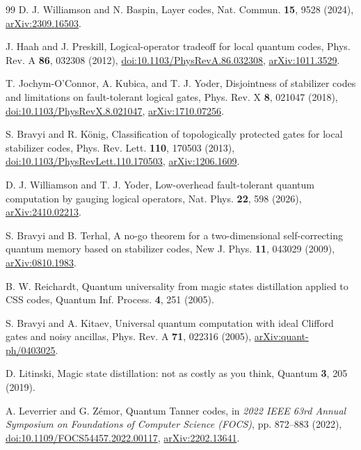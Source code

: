 \begin{thebibliography}{99}
D. J. Williamson and N. Baspin, Layer codes, Nat. Commun. \textbf{15}, 9528 (2024), \href{https://arxiv.org/abs/2309.16503}{arXiv:2309.16503}.

J. Haah and J. Preskill, Logical-operator tradeoff for local quantum codes, Phys. Rev. A \textbf{86}, 032308 (2012), \href{https://doi.org/10.1103/PhysRevA.86.032308}{doi:10.1103/PhysRevA.86.032308}, \href{https://arxiv.org/abs/1011.3529}{arXiv:1011.3529}.

T. Jochym-O'Connor, A. Kubica, and T. J. Yoder, Disjointness of stabilizer codes and limitations on fault-tolerant logical gates, Phys. Rev. X \textbf{8}, 021047 (2018), \href{https://doi.org/10.1103/PhysRevX.8.021047}{doi:10.1103/PhysRevX.8.021047}, \href{https://arxiv.org/abs/1710.07256}{arXiv:1710.07256}.

S. Bravyi and R. K\"onig, Classification of topologically protected gates for local stabilizer codes, Phys. Rev. Lett. \textbf{110}, 170503 (2013), \href{https://doi.org/10.1103/PhysRevLett.110.170503}{doi:10.1103/PhysRevLett.110.170503}, \href{https://arxiv.org/abs/1206.1609}{arXiv:1206.1609}.

D. J. Williamson and T. J. Yoder, Low-overhead fault-tolerant quantum computation by gauging logical operators, Nat. Phys. \textbf{22}, 598 (2026), \href{https://arxiv.org/abs/2410.02213}{arXiv:2410.02213}.

S. Bravyi and B. Terhal, A no-go theorem for a two-dimensional self-correcting quantum memory based on stabilizer codes, New J. Phys. \textbf{11}, 043029 (2009), \href{https://arxiv.org/abs/0810.1983}{arXiv:0810.1983}.

B. W. Reichardt, Quantum universality from magic states distillation applied to CSS codes, Quantum Inf. Process. \textbf{4}, 251 (2005).

S. Bravyi and A. Kitaev, Universal quantum computation with ideal Clifford gates and noisy ancillas, Phys. Rev. A \textbf{71}, 022316 (2005), \href{https://arxiv.org/abs/quant-ph/0403025}{arXiv:quant-ph/0403025}.

D. Litinski, Magic state distillation: not as costly as you think, Quantum \textbf{3}, 205 (2019).

A. Leverrier and G. Z\'emor, Quantum Tanner codes, in \emph{2022 IEEE 63rd Annual Symposium on Foundations of Computer Science (FOCS)}, pp. 872--883 (2022), \href{https://doi.org/10.1109/FOCS54457.2022.00117}{doi:10.1109/FOCS54457.2022.00117}, \href{https://arxiv.org/abs/2202.13641}{arXiv:2202.13641}.


\end{thebibliography}
